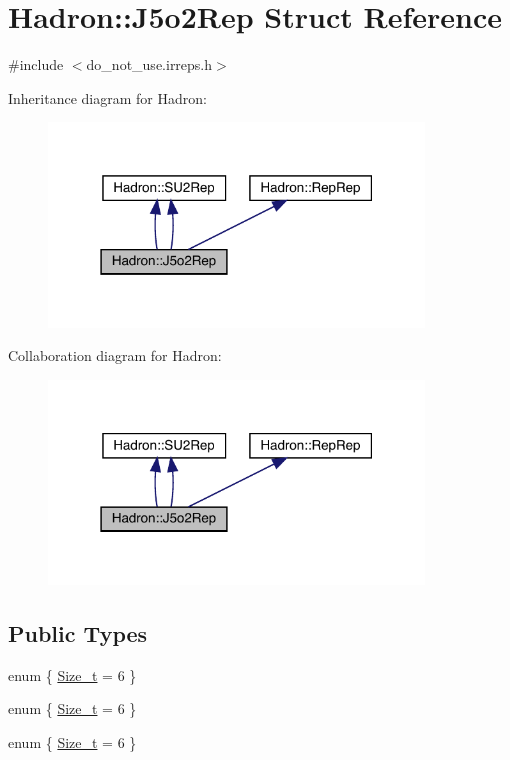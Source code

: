\hypertarget{structHadron_1_1J5o2Rep}{}\section{Hadron\+:\+:J5o2\+Rep Struct Reference}
\label{structHadron_1_1J5o2Rep}


{\ttfamily \#include $<$do\+\_\+not\+\_\+use.\+irreps.\+h$>$}



Inheritance diagram for Hadron\+:\nopagebreak
\begin{figure}[H]
\begin{center}
\leavevmode
\includegraphics[width=283pt]{d2/dd9/structHadron_1_1J5o2Rep__inherit__graph}
\end{center}
\end{figure}


Collaboration diagram for Hadron\+:\nopagebreak
\begin{figure}[H]
\begin{center}
\leavevmode
\includegraphics[width=283pt]{d4/d3e/structHadron_1_1J5o2Rep__coll__graph}
\end{center}
\end{figure}
\subsection*{Public Types}
\begin{DoxyCompactItemize}
\item 
enum \{ \mbox{\hyperlink{structHadron_1_1J5o2Rep_aaf46921e69a05786461979f9d80e5c4fa901b5b392ebf13c294bd161aef19a01b}{Size\+\_\+t}} = 6
 \}
\item 
enum \{ \mbox{\hyperlink{structHadron_1_1J5o2Rep_aaf46921e69a05786461979f9d80e5c4fa901b5b392ebf13c294bd161aef19a01b}{Size\+\_\+t}} = 6
 \}
\item 
enum \{ \mbox{\hyperlink{structHadron_1_1J5o2Rep_aaf46921e69a05786461979f9d80e5c4fa901b5b392ebf13c294bd161aef19a01b}{Size\+\_\+t}} = 6
 \}
\end{DoxyCompactItemize}
